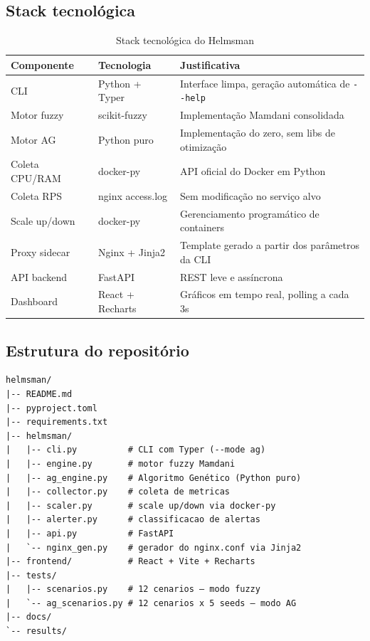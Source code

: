 \documentclass[12pt, a4paper]{article}
\begin{document}
\subsection{Stack tecnológica}

\begin{table}[H]
  \centering
  \caption{Stack tecnológica do Helmsman}
  \label{tab:stack}
  \begin{tabularx}{\textwidth}{llX}
    \toprule
    \rowcolor{headerblue}
    \textbf{Componente} & \textbf{Tecnologia} & \textbf{Justificativa} \\
    \midrule
    CLI              & Python + Typer    & Interface limpa, geração automática de \texttt{-{}-help} \\
    Motor fuzzy      & scikit-fuzzy      & Implementação Mamdani consolidada \\
    Motor AG         & Python puro       & Implementação do zero, sem libs de otimização \\
    Coleta CPU/RAM   & docker-py         & API oficial do Docker em Python \\
    Coleta RPS       & nginx access.log  & Sem modificação no serviço alvo \\
    Scale up/down    & docker-py         & Gerenciamento programático de containers \\
    Proxy sidecar    & Nginx + Jinja2    & Template gerado a partir dos parâmetros da CLI \\
    API backend      & FastAPI           & REST leve e assíncrona \\
    Dashboard        & React + Recharts  & Gráficos em tempo real, polling a cada 3s \\
    \bottomrule
  \end{tabularx}
\end{table}

\subsection{Estrutura do repositório}

\begin{lstlisting}[caption={Estrutura de pastas do repositório GitHub}]
helmsman/
|-- README.md
|-- pyproject.toml
|-- requirements.txt
|-- helmsman/
|   |-- cli.py          # CLI com Typer (--mode ag)
|   |-- engine.py       # motor fuzzy Mamdani
|   |-- ag_engine.py    # Algoritmo Genético (Python puro)
|   |-- collector.py    # coleta de metricas
|   |-- scaler.py       # scale up/down via docker-py
|   |-- alerter.py      # classificacao de alertas
|   |-- api.py          # FastAPI
|   `-- nginx_gen.py    # gerador do nginx.conf via Jinja2
|-- frontend/           # React + Vite + Recharts
|-- tests/
|   |-- scenarios.py    # 12 cenarios — modo fuzzy
|   `-- ag_scenarios.py # 12 cenarios x 5 seeds — modo AG
|-- docs/
`-- results/
\end{lstlisting}
\end{document}
